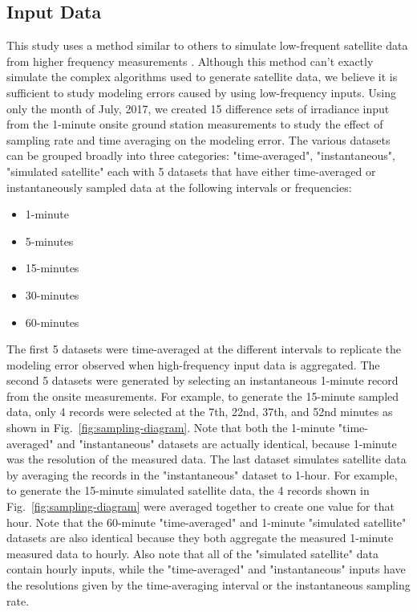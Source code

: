 \documentclass[conference]{IEEEtran}
\begin{document}
\subsection{Input Data}
This study uses a method similar to others to simulate low-frequent satellite data from higher frequency measurements \cite{Bowersox2021}. Although this method can't exactly simulate the complex algorithms used to generate satellite data, we believe it is sufficient to study modeling errors caused by using low-frequency inputs. Using only the month of July, 2017, we created 15 difference sets of irradiance input from the 1-minute onsite ground station measurements to study the effect of sampling rate and time averaging on the modeling error. The various datasets can be grouped broadly into three categories: "time-averaged", "instantaneous", "simulated satellite" each with 5 datasets that have either time-averaged or instantaneously sampled data at the following intervals or frequencies:

\begin{itemize}
    \item 1-minute
    \item 5-minutes
    \item 15-minutes
    \item 30-minutes
    \item 60-minutes
\end{itemize}

The first 5 datasets were time-averaged at the different intervals to replicate the modeling error observed when high-frequency input data is aggregated. The second 5 datasets were generated by selecting an instantaneous 1-minute record from the onsite measurements. For example, to generate the 15-minute sampled data, only 4 records were selected at the 7th, 22nd, 37th, and 52nd minutes as shown in Fig.~\ref{fig:sampling-diagram}. Note that both the 1-minute "time-averaged" and "instantaneous" datasets are actually identical, because 1-minute was the resolution of the measured data. The last dataset simulates satellite data by averaging the records in the "instantaneous" dataset to 1-hour. For example, to generate the 15-minute simulated satellite data, the 4 records shown in Fig.~\ref{fig:sampling-diagram} were averaged together to create one value for that hour. Note that the 60-minute "time-averaged" and 1-minute "simulated satellite" datasets are also identical because they both aggregate the measured 1-minute measured data to hourly. Also note that all of the "simulated satellite" data contain hourly inputs, while the "time-averaged" and "instantaneous" inputs have the resolutions given by the time-averaging interval or the instantaneous sampling rate.
\end{document}
